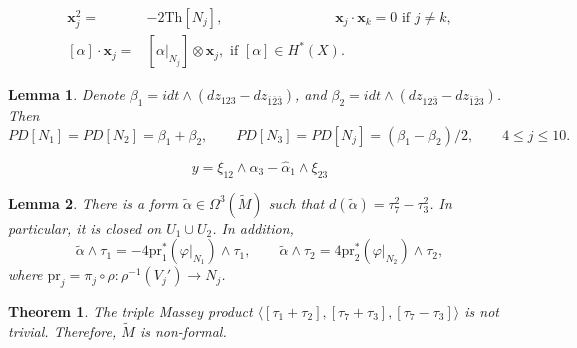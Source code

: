 \documentclass[10pt,a4paper]{amsart}
\newtheorem{lem}{Lemma}
\newtheorem{theorem}{Theorem}
\renewcommand{\b}{\beta}
\newcommand{\la}{\langle}
\newcommand{\ra}{\rangle}
\begin{document}
\begin{align}
\mathbf{x}_j^2=&-2\mathrm{Th}[N_j], \qquad \qquad \qquad \qquad  \mathbf{x}_{j}\cdot \mathbf{x}_{k}=0 \mbox{ if } j\neq k, \label{eqn:prod-1} \\
[\alpha] \cdot \mathbf{x}_{j}=& [\alpha|_{N_j}]\otimes \mathbf{x}_j, \mbox{ if } [\alpha] \in H^*(X). \label{eqn:prod-2}
\end{align}

\begin{lem} \label{lem:PDuals}
Denote $\b_1=i dt\wedge (dz_{123} - dz_{\bar{1}\bar{2}\bar{3}})$, and  $\b_2=idt \wedge (dz_{12\bar{3}} - dz_{\bar{1}\bar{2}3})$. Then 
$$
PD[N_1]=PD[N_2]=\beta_1+\beta_2, \qquad 
PD[N_3]=PD[N_j]=(\beta_1 - \beta_2)/2, \qquad 4 \leq j \leq 10.
$$
\end{lem}

\begin{equation} \label{eqn:closed-Massey}
    y= \xi_{12} \wedge \alpha_3 - \hat{\alpha}_1 \wedge  {\xi}_{23}
\end{equation}

\begin{lem} \label{lem:prim-wtM}
There is a form $\widetilde{\alpha} \in \Omega^3(\widetilde{M})$ such that $d(\widetilde{\alpha})=\tau_7^2-\tau_3^2$.
In particular, it is closed on $U_1\cup U_2$. In addition,
$$
\widetilde{\alpha} \wedge \tau_1= -4\mathrm{pr}^*_1(\varphi|_{N_1}) \wedge \tau_1, \qquad
\widetilde{\alpha} \wedge \tau_2= 4\mathrm{pr}^*_2(\varphi|_{N_2}) \wedge \tau_2,
$$
where $\mathrm{pr}_j=\pi_j \circ \rho \colon \rho^{-1}(V_j') \to N_j$.
\end{lem}

\begin{theorem} \label {theo:non-formal}
The triple Massey product $\la [\tau_1 + \tau_2], [\tau_7+ \tau_3], [\tau_7-\tau_3] \ra$ is not trivial.
Therefore, $\widetilde{M}$ is non-formal.
\end{theorem}
\end{document}

